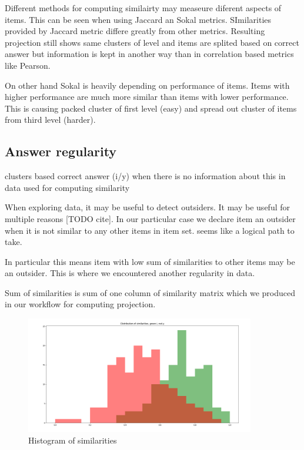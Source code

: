 \documentclass[
  digital, %
  table,   %
  nolof,     %
  nolot,     %
  nocover
]{fithesis3}
\begin{document}
Different methods for computing similairty may measeure diferent aspects
of items. This can be seen when using Jaccard an Sokal metrics.
SImilarities provided by Jaccard metric differe greatly from other
metrics. Resulting projection still shows same clusters of level and
items are splited based on correct answer but information is kept in
another way than in correlation based metrics like Pearson.

On other hand Sokal is heavily depending on performance of items. Items
with higher performance are much more similar than items with lower
performance. This is causing packed cluster of first level (easy) and
spread out cluster of items from third level (harder).


\subsection{Answer regularity}\label{answer-regularity}

clusters based correct answer (i/y) when there is no information about
this in data used for computing similarity


When exploring data, it may be useful to detect outsiders. It may be
useful for multiple reasons {[}TODO cite{]}. In our particular case we
declare item an outsider when it is not similar to any other items in
item set. seems like a logical path to take.

In particular this means item with low sum of similarities to other
items may be an outsider. This is where we encountered another
regularity in data.


Sum of similarities is sum of one column of similarity matrix which we
produced in our workflow for computing projection.

\begin{figure}
  \begin{center}
    \includegraphics[width=10cm]{img/iy_histogram}
  \end{center}
  \caption{Histogram of similarities}
  \label{ref:iyhistogram}
\end{figure}
\end{document}
